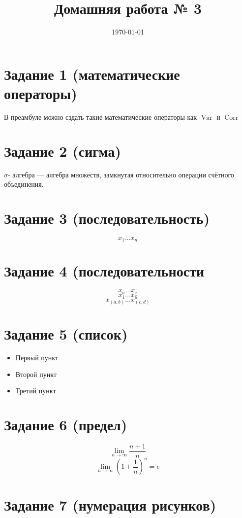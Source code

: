\documentclass[12pt, a4paper]{article}
\title{Домашняя работа № 3}
\date{\today}
\theoremstyle{plain}              %
\DeclareMathOperator{\Corr}{Corr}
\DeclareMathOperator{\Var}{Var}
\begin{document}
\maketitle

\section{Задание 1 (математические операторы)}
В преамбуле можно сздать такие математические операторы как $\Var$ и $\Corr$

\section{Задание 2 (сигма)}
\newcommand{\s}{\ensuremath{\sigma}}
\s - алгебра — алгебра множеств, замкнутая относительно операции счётного объединения.

\section{Задание 3 (последовательность)}
\newcommand{\n}{\ensuremath{x_1	\ldots	x_n}}
\[ \n \]

\section{Задание 4 (последовательности }
\newcommand{\nn}[2]{\ensuremath{x_{#1} \ldots x_{#2}}}
\[ \nn{a}{z} \]
\[ \nn{1}{6} \]
\[ \nn{(a,b)}{(c,d)} \]

\section{Задание 5 (список)}
\begin{itemize}
\newcommand{\itemcolor}[1]{\renewcommand{\makelabel}[1]{\color{#1}\hfil ##1}}
\itemcolor{blue}
\item  Первый пункт 
\item  Второй пункт 
\item  Третий пункт 
\end{itemize}

\section{Задание 6 (предел)}
\newcommand{\llim}[3]{\ensuremath{\lim\limits_{{#1} \to {#2}} {#3}}}

\[ \llim{n}{\infty}{\frac{n+1}{n}} \]
\[ \llim{n}{\infty}{\left(1+\frac{1}{n}\right)^n = e} \]

\section{Задание 7 (нумерация рисунков)}
\setcounter{figure}{0}
\renewcommand{\thefigure}{\arabic{section}.\arabic{figure}}
\end{document}
